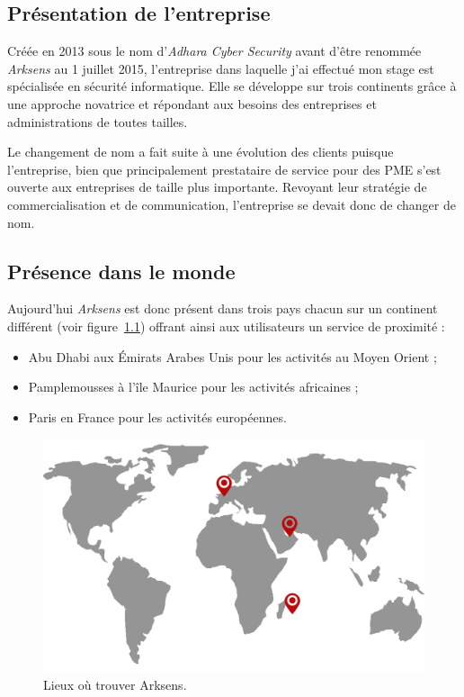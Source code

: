 \documentclass[a4paper,10pt, twoside]{report}
\begin{document}
\begin{spacing}{1.2}
\chapter{Présentation de l'entreprise}
\thispagestyle{fancy}
Créée en 2013 sous le nom d'\textit{Adhara Cyber Security} avant
d'être renommée \textit{Arksens} au 1 juillet 2015, l'entreprise 
dans laquelle j'ai effectué mon stage est spécialisée en sécurité
informatique. Elle se développe sur trois continents grâce à une
approche novatrice et répondant aux besoins des entreprises et
administrations de toutes tailles.

Le changement de nom a fait suite à une évolution des clients puisque
l'entreprise, bien que principalement prestataire de service pour des PME
s'est ouverte aux entreprises de taille plus importante. Revoyant leur
stratégie de commercialisation et de communication, l'entreprise se devait
donc de changer de nom.

\section{Présence dans le monde}

Aujourd'hui \textit{Arksens} est donc présent dans trois pays chacun sur
un continent différent (voir figure~\ref{mapArksens}) offrant ainsi aux
utilisateurs un service de proximité :
\begin{itemize}
  \item Abu Dhabi aux Émirats Arabes Unis pour les activités au Moyen
  Orient ;
  \item Pamplemousses à l’île Maurice pour les activités africaines ;
  \item Paris en France pour les activités européennes.
\end{itemize}

\begin{figure}[h!]
  \centering
  \includegraphics[scale=0.30]{map_arksens.png}
  \caption{\label{mapArksens} Lieux où trouver Arksens.}
\end{figure}
      

\end{spacing}
\end{document}
